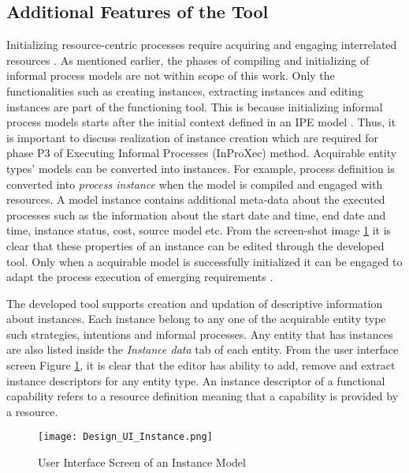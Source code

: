 \subsection{Additional Features of the Tool}
Initializing resource-centric processes require acquiring and engaging interrelated resources \cite{Sungur2015}. As mentioned earlier, the phases of compiling and initializing of informal process models are not within scope of this work. Only the functionalities such as creating instances, extracting instances and editing instances are part of the functioning tool. This is because initializing informal process models starts after the initial context defined in an IPE model \cite{Sungur2015}. Thus, it is important to discuss realization of instance creation which are required for phase P3 of Executing Informal Processes (InProXec) method. Acquirable entity types' models can be converted into instances. For example, process definition is converted into \textit{process instance} when the model is compiled and engaged with resources. A model instance contains additional meta-data about the executed processes such as the information about the start date and time, end date and time, instance status, cost, source model etc. From the screen-shot image \ref{fig:realizationofinstances} it is clear that these properties of an instance can be edited through the developed tool. Only when a acquirable model is successfully initialized it can be engaged to adapt the process execution of emerging requirements \cite{Sungur2015}. 

The developed tool supports creation and updation of descriptive information about instances. Each instance belong to any one of the acquirable entity type such strategies, intentions and informal processes. Any entity that has instances are also listed inside the \textit{Instance data} tab of each entity. From the user interface screen Figure \ref{fig:realizationofinstances}, it is clear that the editor has ability to add, remove and extract instance descriptors for any entity type. An instance descriptor of a functional capability refers to a resource definition meaning that a capability is provided by a resource.
 
\begin{figure} [H]
	\centering
	\texttt{[image: Design\_UI\_Instance.png]}
	\caption{User Interface Screen of an Instance Model}
	\label{fig:realizationofinstances}
\end{figure}

